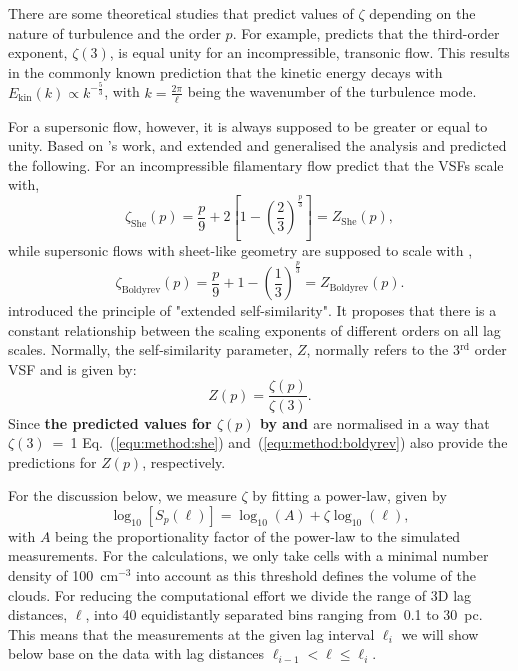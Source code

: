 There are some theoretical studies that predict values of $\zeta$ depending on the nature of turbulence and the order $p$.
For example, \citet{Kolmogorov1941} predicts that the third-order exponent, $\zeta(3)$, is equal unity for an incompressible, transonic flow.
This results in the commonly known prediction that the kinetic energy decays with $E_{\mathrm{kin}}(k) \propto k^{-\frac{5}{3}}$, with $k = \frac{2 \pi}{\ell}$ being the wavenumber of the turbulence mode.

For a supersonic flow, however, it is always supposed to be greater or equal to unity.
Based on \citeauthor{Kolmogorov1941}'s work, \citet{She1994} and \citet{Boldyrev2002} extended and generalised the analysis and predicted the following.
For an incompressible filamentary flow \citet{She1994} predict that the VSFs scale with,
\begin{equation}
	\zeta_\mathrm{She}(p) = \frac{p}{9} + 2 \left[ 1 - \left( \frac{2}{3} \right)^{\frac{p}{3}} \right] = Z_\mathrm{She}(p) ,
    \label{equ:method:she}
\end{equation}
while supersonic flows with sheet-like geometry are supposed to scale with \citep{Boldyrev2002},
\begin{equation}
	 \zeta_\mathrm{Boldyrev}(p) = \frac{p}{9} + 1 - \left( \frac{1}{3} \right)^{\frac{p}{3}} = Z_\mathrm{Boldyrev}(p) .
    \label{equ:method:boldyrev}
\end{equation}
\citet{Benzi1993} introduced the principle of "extended self-similarity".
It proposes that there is a constant relationship between the scaling exponents of different orders on all lag scales. Normally, the self-similarity parameter, $Z$, normally refers to the 3$^\mathrm{rd}$ order VSF and is given by:
\begin{equation}
	Z(p) = \frac{\zeta(p)}{\zeta(3)} .
	\label{equ:method:z_def}
\end{equation} 
Since \textbf{the predicted values for $\zeta(p)$ by \citet{She1994} and \citet{Boldyrev2002}} are normalised in a way that $\zeta(3)$~=~1 Eq.~(\ref{equ:method:she}) and~(\ref{equ:method:boldyrev}) also provide the predictions for $Z(p)$, respectively.

For the discussion below, we measure $\zeta$ by fitting a power-law, given by
\begin{equation}
	\log_{10}\left[ S_p(\ell) \right] = \log_{10}\left(A\right) + \zeta \log_{10}(\ell) ,
    \label{equ:method:fitting}
\end{equation}
with $A$ being the proportionality factor of the power-law to the simulated measurements.
For the calculations, we only take cells with a minimal number density of 100~cm$^{-3}$ into account as this threshold defines the volume of the clouds.
For reducing the computational effort we divide the range of 3D lag distances, $\ell$, into 40 equidistantly separated bins ranging from~0.1 to 30~pc.
This means that the measurements at the given lag interval $\ell_i$ we will show below base on the data with lag distances $\ell_{i-1} < \ell \leq \ell_i$.

